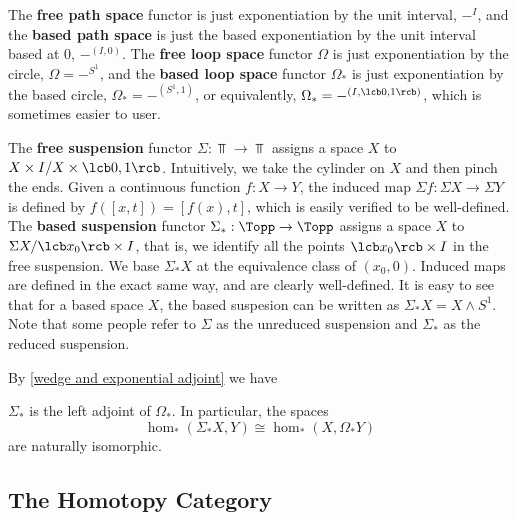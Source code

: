 The \textbf{free path space} functor is just exponentiation by the unit interval, $-^I$, and the \textbf{based path space} is just the based exponentiation by the unit interval based at 0, $-^{(I,0)}$. The \textbf{free loop space} functor $\Omega$ is just exponentiation by the circle, $\Omega = -^{S^1}$, and the \textbf{based loop space} functor $\Omega_*$ is just exponentiation by the based circle, $\Omega_* = -^{(S^1,1)}$, or equivalently, $\Omega_* = -^{(I,\lcb 0,1 \rcb)}$, which is sometimes easier to user.

The \textbf{free suspension} functor $\Sigma : \Top \rightarrow \Top$ assigns a space $X$ to $X \times I / X \times \lcb 0,1 \rcb$. Intuitively, we take the cylinder on $X$ and then pinch the ends. Given a continuous function $f : X \rightarrow Y$, the induced map $\Sigma f : \Sigma X \rightarrow \Sigma Y$ is defined by $f([x,t]) = [f(x),t]$, which is easily verified to be well-defined. The \textbf{based suspension} functor $\Sigma_* : \Topp \rightarrow \Topp$ assigns a space $X$ to $\Sigma X / \lcb x_0 \rcb \times I$, that is, we identify all the points $\lcb x_0 \rcb \times I$ in the free suspension.  We base $\Sigma_* X$ at the equivalence class of $(x_0,0)$. Induced maps are defined in the exact same way, and are clearly well-defined. It is easy to see that for a based space $X$, the based suspesion can be written as $\Sigma_* X = X \wedge S^1$. Note that some people refer to $\Sigma$ as the unreduced suspension and $\Sigma_*$ as the reduced suspension.

By \cref{wedge and exponential adjoint} we have
\begin{cor}
$\Sigma_*$ is the left adjoint of $\Omega_*$. In particular, the spaces
\[ \hom_*(\Sigma_* X,Y) \cong \hom_*(X,\Omega_* Y) \]
are naturally isomorphic.
\end{cor}



\subsection{The Homotopy Category}


